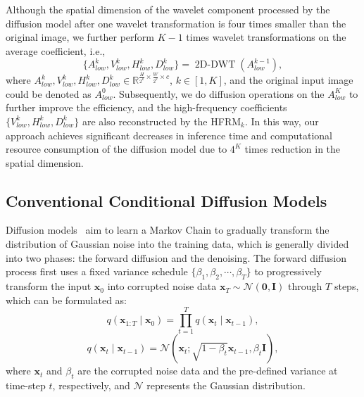 Although the spatial dimension of the wavelet component processed by the diffusion model after one wavelet transformation is four times smaller than the original image, we further perform $K-1$ times wavelet transformations on the average coefficient, i.e.,
\begin{equation}\label{eq:2}
	\{A_{low}^{k}, V_{low}^{k}, H_{low}^{k}, D_{low}^{k}\} = \operatorname{2D-DWT}(A_{low}^{k-1}),
\end{equation}
where $A_{low}^{k}, V_{low}^{k}, H_{low}^{k}, D_{low}^{k} \in \mathbb{R}^{\frac{H}{2^{k}} \times \frac{W}{2^{k}} \times c}$, $k \in [1, K]$,  and the original input image could be denoted as $A_{low}^{0}$. Subsequently, we do diffusion operations on the $A_{low}^{K}$ to further improve the efficiency, and the high-frequency coefficients $\{V_{low}^{k}, H_{low}^{k}, D_{low}^{k}\}$ are also reconstructed by the HFRM$_{k}$. In this way, our approach achieves significant decreases in inference time and computational resource consumption of the diffusion model due to $4^{K}$ times reduction in the spatial dimension.

\subsection{Conventional Conditional Diffusion Models}\label{subsec:Conventional Conditional Diffusion Models}
Diffusion models~\cite{ddim,ddpm} aim to learn a Markov Chain to gradually transform the distribution of Gaussian noise into the training data, which is generally divided into two phases: the forward diffusion and the denoising. The forward diffusion process first uses a fixed variance schedule $\{\beta_1, \beta_2, \cdots, \beta_T\}$ to progressively transform the input $\mathbf{x}_0$ into corrupted noise data $\mathbf{x}_T \sim \mathcal{N}(\mathbf{0},\mathbf{I})$ through $T$ steps, which can be formulated as:
\begin{equation}\label{eq:3}
	q(\mathbf{x}_{1:T} \mid \mathbf{x}_0)=\prod_{t=1}^T q(\mathbf{x}_t \mid \mathbf{x}_{t-1}),
\end{equation}
\begin{equation}\label{eq:4}
	q(\mathbf{x}_t \mid \mathbf{x}_{t-1})=\mathcal{N}(\mathbf{x}_t ; \sqrt{1-\beta_t} \mathbf{x}_{t-1}, \beta_t \mathbf{I}),
\end{equation}
where $\mathbf{x}_t$ and $\beta_t$ are the corrupted noise data and the pre-defined variance at time-step $t$, respectively, and $\mathcal{N}$ represents the Gaussian distribution.

